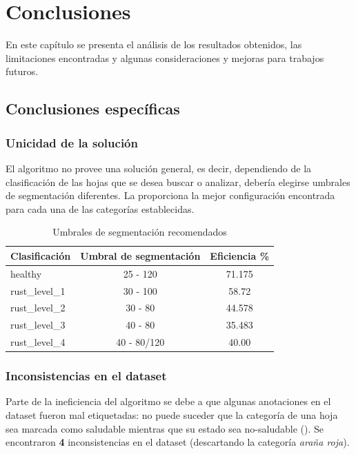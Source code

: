 \chapter{Conclusiones}
En este capítulo se presenta el análisis de los resultados obtenidos, las limitaciones encontradas y algunas consideraciones y mejoras para trabajos futuros.

\section{Conclusiones específicas}

\subsection{Unicidad de la solución}
El algoritmo no provee una solución general, es decir, dependiendo de la clasificación de las hojas que se desea buscar o analizar, debería elegirse umbrales de segmentación diferentes. La  proporciona la mejor configuración encontrada para cada una de las categorías establecidas.

\begin{table}[H]
\centering
\begin{tabular}{|l|c|c|}
\hline 
\textbf{Clasificación} & \textbf{Umbral de segmentación} & \textbf{Eficiencia \%}\\ 
\hline 
healthy & 25 - 120 & 71.175 \\ 
\hline 
rust\_level\_1 & 30 - 100 & 58.72 \\ 
\hline 
rust\_level\_2 & 30 - 80 & 44.578 \\ 
\hline 
rust\_level\_3 & 40 - 80 & 35.483 \\ 
\hline 
rust\_level\_4 & 40 - 80/120 & 40.00 \\ 
\hline 
\end{tabular}
\caption{Umbrales de segmentación recomendados}
\label{table:recommended_segmentation}
\end{table}

\subsection{Inconsistencias en el dataset}

Parte de la ineficiencia del algoritmo se debe a que algunas anotaciones en el dataset fueron mal etiquetadas: no puede suceder que la categoría de una hoja sea marcada como saludable mientras que su estado sea no-saludable (). Se encontraron \textbf{4} inconsistencias en el dataset (descartando la categoría \textit{araña roja}).

